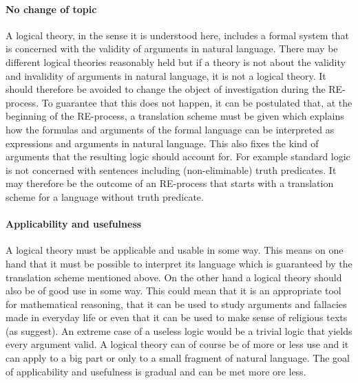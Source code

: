 \documentclass{article}
\begin{document}
\paragraph{No change of topic} A logical theory, in the sense it is understood here, includes a formal system that is concerned with the validity of arguments in natural language. There may be different logical theories reasonably held but if a theory is not about the validity and invalidity of arguments in natural language, it is not a logical theory. It should therefore be avoided to change the object of investigation during the RE-process. To guarantee that this does not happen, it can be postulated that, at the beginning of the RE-process, a translation scheme must be given which explains how the formulas and arguments of the formal language can be interpreted as expressions and arguments in natural language. This also fixes the kind of arguments that the resulting logic should account for. For example standard logic is not concerned with sentences including (non-eliminable) truth predicates. It may therefore be the outcome of an RE-process that starts with a translation scheme for a language without truth predicate. %

\paragraph{Applicability and usefulness} A logical theory must be applicable and usable in some way. This means on one hand that it must be possible to interpret its language which is guaranteed by the translation scheme mentioned above. On the other hand a logical theory should also be of good use in some way. This could mean that it is an appropriate tool for mathematical reasoning, that it can be used to study arguments and fallacies made in everyday life or even that it can be used to make sense of religious texts (as  suggest). An extreme case of a useless logic would be a trivial logic that yields every argument valid. A logical theory can of course be of more or less use and it can apply to a big part or only to a small fragment of natural language. The goal of applicability and usefulness is gradual and can be met more ore less.
\end{document}
